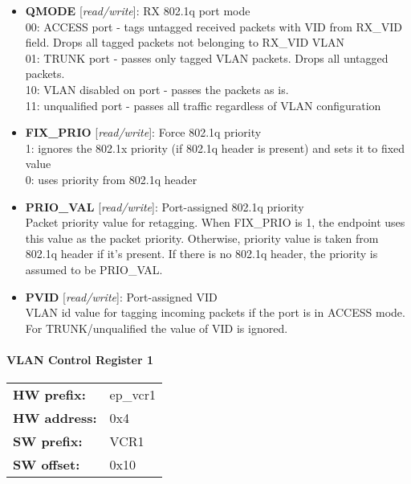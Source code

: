 \begin{itemize}
\item \begin{small}
{\bf 
QMODE
} [\emph{read/write}]: RX 802.1q port mode
\\
00: ACCESS port - tags untagged received packets with VID from RX\_VID field. Drops all tagged packets not belonging to RX\_VID VLAN\\					               01: TRUNK port - passes only tagged VLAN packets. Drops all untagged packets.\\					               10: VLAN disabled on port - passes the packets as is.\\					               11: unqualified port - passes all traffic regardless of VLAN configuration
\end{small}
\item \begin{small}
{\bf 
FIX\_PRIO
} [\emph{read/write}]: Force 802.1q priority
\\
1: ignores the 802.1x priority (if 802.1q header is present) and sets it to fixed value\\					               0: uses priority from 802.1q header
\end{small}
\item \begin{small}
{\bf 
PRIO\_VAL
} [\emph{read/write}]: Port-assigned 802.1q priority
\\
Packet priority value for retagging. When FIX\_PRIO is 1, the endpoint uses this value as the packet priority. Otherwise, priority value is taken from 802.1q header if it's present. If there is no 802.1q header, the priority is assumed to be PRIO\_VAL.
\end{small}
\item \begin{small}
{\bf 
PVID
} [\emph{read/write}]: Port-assigned VID
\\
VLAN id value for tagging incoming packets if the port is in ACCESS mode. For TRUNK/unqualified the value of VID is ignored.
\end{small}
\end{itemize}
\paragraph*{VLAN Control Register 1}\vspace{12pt}

\begin{tabular}{l l }
{\bf HW prefix:}  & ep\_vcr1\\
{\bf HW address:}  & 0x4\\
{\bf SW prefix:}  & VCR1\\
{\bf SW offset:}  & 0x10\\
\end{tabular}

